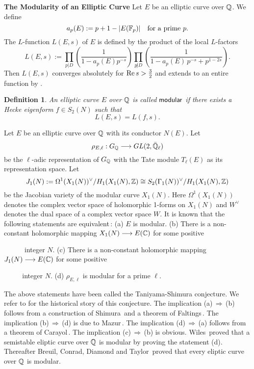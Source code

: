 \documentclass[11pt]{amsart}
\newtheorem{definition}[theorem]{Definition}
\begin{document}
\begin{section}{{\bf The Modularity of an Elliptic Curve}}
\vskip 3mm
Let $E$ be an elliptic curve over $\mathbb Q$. We define
\begin{equation*}
  a_p(E):=p+1-|E({\mathbb F}_p)| \quad {\rm for\ a\ prime}\ p.
\end{equation*}
The $L$-function $L(E,s)$ of $E$ is defined by the product of the local $L$-factors
\begin{equation*}
  L(E,s):=\prod_{p|D}\left( \frac{1}{1-a_p(E)p^{-s}}\right)
  \prod_{p\not| D}\left( \frac{1}{1-a_p(E)\,p^{-s}+p^{1-2s}}\right).
\end{equation*}
Then $L(E,s)$ converges absolutely for ${\rm Re}\,s> \frac{3}{2}$ and extends to
an entire function by \cite{BCDT}.
\begin{definition}\label{1.3}
An elliptic curve $E$ over $\mathbb Q$ is called
${\sf modular}$ if there exists a Hecke eigenform $f\in S_2(N)$ such that
\begin{equation*}
  L(E,s)=L(f,s).
\end{equation*}
\end{definition}
Let $E$ be an elliptic curve over $\mathbb Q$ with its conductor $N(E)$.
Let $$\rho_{E,\ell}:G_\mathbb Q \longrightarrow GL(2,\bar{\mathbb Q}_\ell)$$
be the $\ell$-adic representation of $G_\mathbb Q$ with the Tate module
$T_\ell (E)$ as its representation space. Let
\begin{equation*}
  J_1(N):=\Omega^1(X_1(N))^{\vee}/H_1(X_1(N),\mathbb Z)\cong S_2(\Gamma_1(N))^{\vee}/H_1(X_1(N),\mathbb Z)
\end{equation*}
be the Jacobian variety of the modular curve $X_1(N)$. Here $\Omega^1(X_1(N))$
denotes the complex vector space of holomorphic 1-forms on $X_1(N)$ and $W^{\vee}$
denotes the dual space of a complex vector space $W$.
It is known that the following statements are equivalent\,:
\vskip 2mm
(a) $E$ is modular.
\vskip 2mm
(b) There is a non-constant holomorphic mapping $X_1(N)\longrightarrow E(\mathbb C)$ for some
positive \par
\ \ \ \ \ \ integer $N$.
\vskip 2mm
(c) There is a non-constant holomorphic mapping $J_1(N)\longrightarrow E(\mathbb C)$ for some positive \par
\ \ \ \ \ \,integer $N$.
\vskip 2mm
(d) $\rho_{E,\ell}$ is modular for a prime $\ell$.

\vskip 3mm
The above statements have been called the Taniyama-Shimura conjecture. We refer to
\cite{Sh3} for the historical story of this conjecture.
The implication (a)\,$\Longrightarrow$\,(b) follows from a construction of Shimura\,\cite{Sh2}
and a theorem of Faltings\,\cite{F}. The implication (b)\,$\Longrightarrow$\,(d) is due to
Mazur\,\cite{MA}. The implication (d)\,$\Longrightarrow$\,(a) follows from a theorem of
Carayol\,\cite{C}. The implication (c)\,$\Longrightarrow$\,(b) is obvious. Wiles\,\cite{TW,W}
proved that a semistable eliptic curve over $\mathbb Q$ is modular by proving the statement (d).
Thereafter Breuil, Conrad, Diamond and Taylor\,\cite{BCDT} proved that every eliptic curve
over $\mathbb Q$ is modular.


\end{section}
\end{document}
